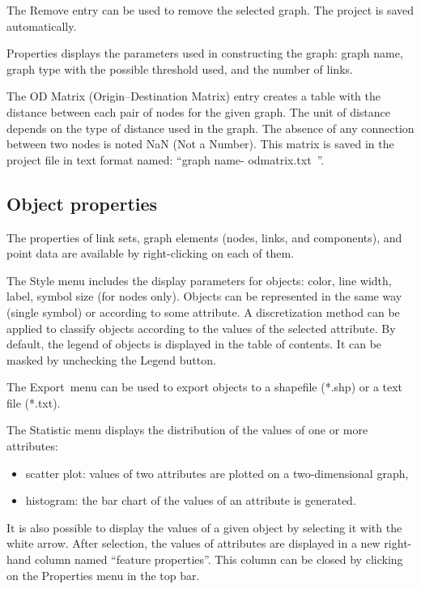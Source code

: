 \documentclass{article}
\begin{document}
The Remove entry can be used to remove the selected graph. The project is saved automatically.

Properties displays the parameters used in constructing the graph: graph name, graph type with the possible threshold used, and the number of links.

The OD Matrix (Origin–Destination Matrix) entry creates a table with the distance between each pair of nodes for the given graph. The unit of distance depends on the type of distance used in the graph. The absence of any connection between two nodes is noted NaN (Not a Number). This matrix is saved in the project file in text format named: “graph name-
odmatrix.txt~”.

\subsection{Object properties}
\label{properties}
The properties of link sets, graph elements (nodes, links, and components), and point data are available by right-clicking on each of them.

The Style menu includes the display parameters for objects: color, line width, label, symbol size (for nodes only). Objects can be represented in the same way (single symbol) or according to some attribute. A discretization method can be applied to classify objects according to the values of the selected attribute. By default, the legend of objects is displayed in the table of contents. It can be masked by unchecking
the Legend button.

The Export~menu can be used to export objects to a shapefile (*.shp) or a text file (*.txt).

The Statistic menu displays the distribution of the values of one or more attributes:
\begin{itemize}
	\item scatter plot: values of two attributes are plotted on a two-dimensional graph,
	\item histogram: the bar chart of the values of an attribute is generated.
\end{itemize}

It is also possible to display the values of a given object by selecting it with the white arrow. After selection, the values of attributes are displayed in a new right-hand column named “feature properties”. This column can be closed by clicking on the Properties menu in the top bar.
\end{document}
